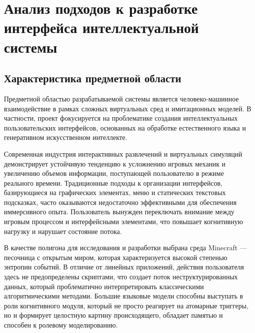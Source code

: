 \section{Анализ подходов к разработке интерфейса интеллектуальной системы}
\label{sec:analysis}

\subsection{Характеристика предметной области}


Предметной областью разрабатываемой системы является человеко-машинное взаимодействие в рамках сложных виртуальных сред и имитационных моделей. В частности, проект фокусируется на проблематике создания интеллектуальных пользовательских интерфейсов, основанных на обработке естественного языка и генеративном искусственном интеллекте\cite{Nielsen1993}.

Современная индустрия интерактивных развлечений и виртуальных симуляций демонстрирует устойчивую тенденцию к усложнению игровых механик и увеличению объемов информации, поступающей пользователю в режиме реального времени. Традиционные подходы к организации интерфейсов, базирующиеся на графических элементах, меню и статических текстовых подсказках, часто оказываются недостаточно эффективными для обеспечения иммерсивного опыта. Пользователь вынужден переключать внимание между игровым процессом и интерфейсными элементами, что повышает когнитивную нагрузку и нарушает состояние потока\cite{Csikszentmihalyi1990,Sweller1988}.

В качестве полигона для исследования и разработки выбрана среда Minecraft — песочница с открытым миром, которая характеризуется высокой степенью энтропии событий. В отличие от линейных приложений, действия пользователя здесь не предопределены скриптами, что создает поток неструктурированных данных, который проблематично интерпретировать классическими алгоритмическими методами. Большие языковые модели способны выступать в роли когнитивного модуля, который не просто реагирует на атомарные триггеры, но и формирует целостную картину происходящего, обладает памятью и способен к ролевому моделированию\cite{Brown2020,Park2023}.

